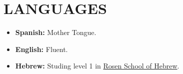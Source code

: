 \documentclass[paper=letter,fontsize=11pt]{scrartcl} %
\newcommand{\sepspace}{\vspace*{1em}}		%
\newcommand{\NewPart}[2]{\section*{\uppercase{#1} \small \normalfont #2}}
\newcommand{\WorkEntry}[5]{
		\noindent \textbf{#1}
        \noindent \small \textit{#2}
        \hfill      %
        \colorbox{White}{%
			\parbox{6em}{%
			\hfill\color{Black}#3}} \par  %
		\noindent \textit{#4} \par        %
		\noindent\hangindent=2em\hangafter=0 \small #5 %
		\normalsize \par}
\newcommand{\Text}[1]{\par       
		\noindent \small #1 
		\normalsize \par}
\begin{document}
\sepspace

\NewPart{LANGUAGES}{}

\begin{itemize}
\item \textbf{Spanish:} Mother Tongue.
\item \textbf{English:} Fluent.
\item \textbf{Hebrew:} Studing level 1 in {\href{https://rosenhebrewschool.com/}{Rosen School of Hebrew}}.
\end{itemize}

\end{document}
